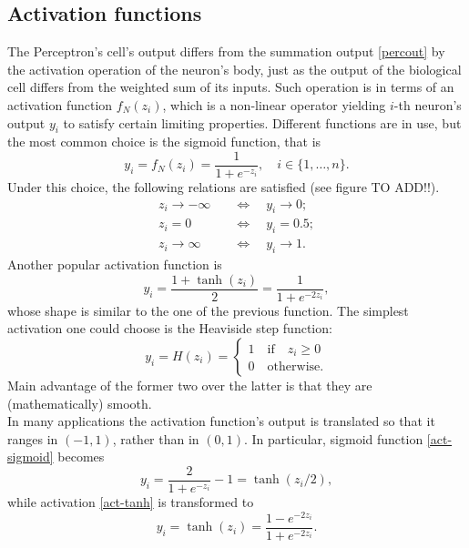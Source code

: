 \documentclass[%
    corpo=11pt,
    twoside,
    stile=classica,
    oldstyle,
    autoretitolo,
    tipotesi=magistrale,
    greek,
    evenboxes,
    english
]{toptesi}
\begin{document}
\subsection{Activation functions}
\label{percact}
The Perceptron's cell's output differs from the summation output \ref{percout} by the activation operation of the neuron's body, just as the output of the biological cell differs from the weighted sum of its inputs. Such operation is in terms of an activation function $f_N(z_i)$, which is a non-linear operator yielding $i$-th neuron's output $y_i$ to satisfy certain limiting properties. Different functions are in use, but the most common choice is the sigmoid function, that is
\begin{equation}
\label{act-sigmoid}
y_i = f_N(z_i) = \frac{1}{1 + e^{-z_i}}, \quad i \in \{1,\dots,n\}.
\end{equation}
Under this choice, the following relations are satisfied (see figure TO ADD!!).
\begin{align*}
z_i \to - \infty \quad &\Longleftrightarrow \quad y_i \to 0 ;\\
z_i = 0 \quad &\Longleftrightarrow \quad y_i = 0.5; \\
z_i \to  \infty \quad &\Longleftrightarrow \quad y_i \to 1.
\end{align*}
Another popular activation function is
\begin{equation}
\label{act-tanh}
y_i = \frac{1 + \tanh(z_i)}{2} = \frac{1}{1 + e^{-2z_i}},
\end{equation}
whose shape is similar to the one of the previous function. The simplest activation one could choose is the Heaviside step function:
\begin{equation*}
y_i = H(z_i) = \begin{cases}
1 \quad \text{if} \quad z_i \geq 0 \\
0 \quad \text{otherwise.}
\end{cases}
\end{equation*}
Main advantage of the former two over the latter is that they are (mathematically) smooth. \\
In many applications the activation function's output is translated so that it ranges in $\left(-1, 1\right)$, rather than in $\left(0, 1 \right)$. In particular, sigmoid function \eqref{act-sigmoid} becomes 
\begin{equation}
y_i = \frac{2}{1 + e^{-z_i}} -1 = \tanh(z_i/2),
\end{equation}
while activation \eqref{act-tanh} is transformed to 
\begin{equation}
y_i = \tanh(z_i) = \frac{1 - e^{-2z_i}}{1 + e^{-2z_i}}.
\end{equation}
\end{document}
